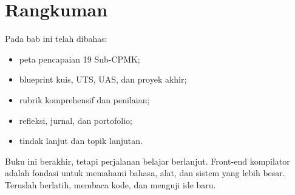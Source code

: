 \section*{Rangkuman}

Pada bab ini telah dibahas:
\begin{itemize}[leftmargin=*]
  \item peta pencapaian 19 Sub-CPMK;
  \item blueprint kuis, UTS, UAS, dan proyek akhir;
  \item rubrik komprehensif dan penilaian;
  \item refleksi, jurnal, dan portofolio;
  \item tindak lanjut dan topik lanjutan.
\end{itemize}

Buku ini berakhir, tetapi perjalanan belajar berlanjut. Front-end
kompilator adalah fondasi untuk memahami bahasa, alat, dan sistem
yang lebih besar. Teruslah berlatih, membaca kode, dan menguji ide
baru.
